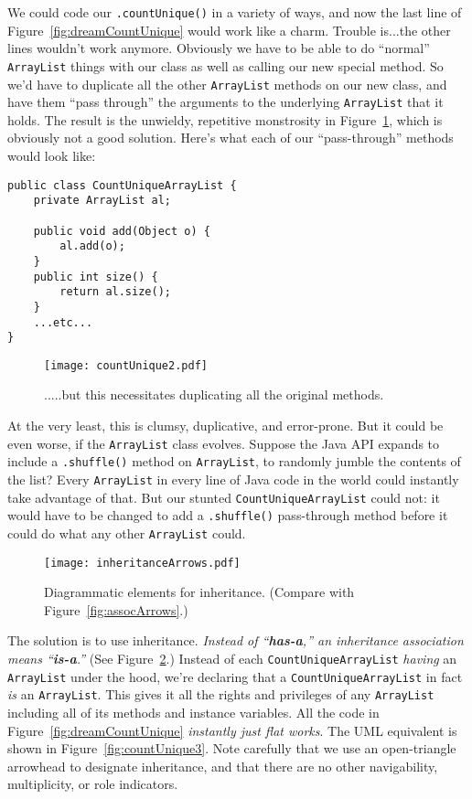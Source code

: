 We could code our \texttt{.countUnique()} in a variety of ways, and now the
last line of Figure~\ref{fig:dreamCountUnique} would work like a charm.
Trouble is...the other lines wouldn't work anymore. Obviously we have to be
able to do ``normal'' \texttt{ArrayList} things with our class as well as
calling our new special method. So we'd have to duplicate all the other
\texttt{ArrayList} methods on our new class, and have them ``pass through'' the
arguments to the underlying \texttt{ArrayList} that it holds. The result is
the unwieldy, repetitive monstrosity in Figure~\ref{fig:countUnique2}, which
is obviously not a good solution. Here's what each of our ``pass-through''
methods would look like:

\begin{Verbatim}[fontsize=\small,samepage=true,frame=single]
public class CountUniqueArrayList {
    private ArrayList al;

    public void add(Object o) {
        al.add(o);
    }
    public int size() {
        return al.size();
    }
    ...etc...
}\end{Verbatim}


\begin{figure}
\centering
\texttt{[image: countUnique2.pdf]}  %
\caption{.....but this necessitates duplicating all the original methods.}
\label{fig:countUnique2}
\end{figure}

At the very least, this is clumsy, duplicative, and error-prone. But it could
be even worse, if the \texttt{ArrayList} class evolves. Suppose the Java API
expands to include a \texttt{.shuffle()} method on \texttt{ArrayList}, to
randomly jumble the contents of the list? Every \texttt{ArrayList} in every
line of Java code in the world could instantly take advantage of that. But our
stunted \texttt{CountUniqueArrayList} could not: it would have to be changed
to add a \texttt{.shuffle()} pass-through method before it could do what any
other \texttt{ArrayList} could.

\label{page:inheritanceArrows}
\begin{figure}
\centering
\texttt{[image: inheritanceArrows.pdf]}
\caption{Diagrammatic elements for inheritance. (Compare with
Figure~\ref{fig:assocArrows}.)}
\label{fig:inheritanceArrows}
\end{figure}

The solution is to use inheritance. \textit{Instead of ``\textbf{has-a},'' an
inheritance association means ``\textbf{is-a}.''} (See
Figure~\ref{fig:inheritanceArrows}.) Instead of each
\texttt{CountUniqueArrayList} \textit{having} an \texttt{ArrayList} under the
hood, we're declaring that a \texttt{CountUniqueArrayList} in fact \textit{is}
an \texttt{ArrayList}. This gives it all the rights and privileges of any
\texttt{ArrayList} including all of its methods and instance variables. All
the code in Figure~\ref{fig:dreamCountUnique} \textit{instantly just flat
works}. The UML equivalent is shown in Figure~\ref{fig:countUnique3}. Note
carefully that we use an open-triangle arrowhead to designate inheritance, and
that there are no other navigability, multiplicity, or role indicators.


